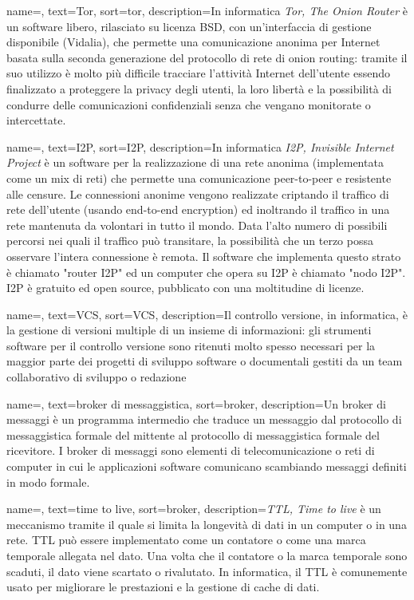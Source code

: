 
{
    name=,
    text=Tor,
    sort=tor,
    description={In informatica \emph{Tor, The Onion Router} è un software libero, rilasciato su licenza BSD, con un'interfaccia di gestione disponibile (Vidalia), che permette una comunicazione anonima per Internet basata sulla seconda generazione del protocollo di rete di onion routing: tramite il suo utilizzo è molto più difficile tracciare l'attività Internet dell'utente essendo finalizzato a proteggere la privacy degli utenti, la loro libertà e la possibilità di condurre delle comunicazioni confidenziali senza che vengano monitorate o intercettate.}
}

{
    name=,
    text=I2P,
    sort=I2P,
    description={In informatica \emph{I2P, Invisible Internet Project} è un software per la realizzazione di una rete anonima (implementata come un mix di reti) che permette una comunicazione peer-to-peer e resistente alle censure. Le connessioni anonime vengono realizzate criptando il traffico di rete dell'utente (usando end-to-end encryption) ed inoltrando il traffico in una rete mantenuta da volontari in tutto il mondo. Data l'alto numero di possibili percorsi nei quali il traffico può transitare, la possibilità che un terzo possa osservare l'intera connessione è remota. Il software che implementa questo strato è chiamato "router I2P" ed un computer che opera su I2P è chiamato "nodo I2P". I2P è gratuito ed open source, pubblicato con una moltitudine di licenze.}
}

{
    name=,
    text=VCS,
    sort=VCS,
    description={Il controllo versione, in informatica, è la gestione di versioni multiple di un insieme di informazioni: gli strumenti software per il controllo versione sono ritenuti molto spesso necessari per la maggior parte dei progetti di sviluppo software o documentali gestiti da un team collaborativo di sviluppo o redazione}
}

{
    name=,
    text=broker di messaggistica,
    sort=broker,
    description={Un broker di messaggi è un programma intermedio
che traduce un messaggio dal protocollo di messaggistica formale del mittente al
protocollo di messaggistica formale del ricevitore. I broker di messaggi sono elementi
di telecomunicazione o reti di computer in cui le applicazioni software comunicano
scambiando messaggi definiti in modo formale.}
}

{
    name=,
    text=time to live,
    sort=broker,
    description={\emph{TTL, Time to live} è un meccanismo tramite il quale si limita la longevità di dati in un computer o in una rete. TTL può essere implementato come un contatore o come una marca temporale allegata nel dato. Una volta che il contatore o la marca temporale sono scaduti, il dato viene scartato o rivalutato. In informatica, il TTL è comunemente usato per migliorare le prestazioni e la gestione di cache di dati.}
}


